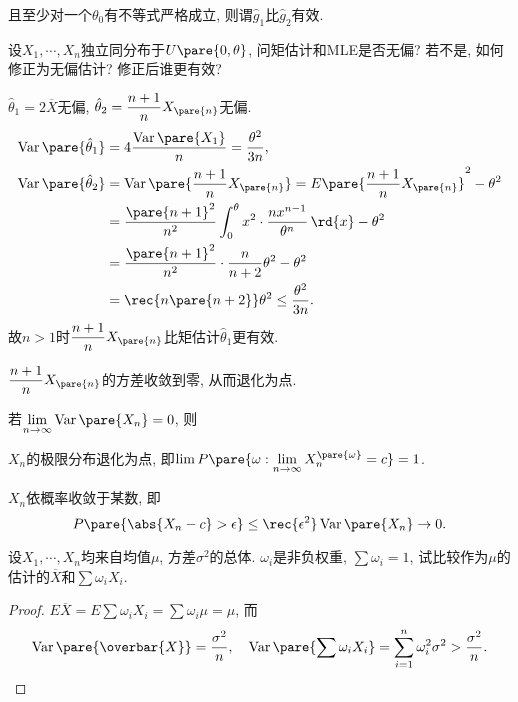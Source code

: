 \documentclass{ctexart}
\DeclareMathOperator{\Var}{Var}
\begin{document}
且至少对一个$\theta_0$有不等式严格成立, 则谓$\hat{g}_1$比$\hat{g}_2$有效.
\begin{sample}
    \begin{ex}
        设$X_1,\cdots,X_n$独立同分布于$U\pare{0,\theta}$, 问矩估计和MLE是否无偏? 若不是, 如何修正为无偏估计? 修正后谁更有效?
    \end{ex}
    \begin{solution}
        $\hat{\theta}_1 = 2\overbar{X}$无偏, $\hat{\theta}_2 = \displaystyle \frac{n+1}{n}X_{\pare{n}}$无偏.
        \begin{align*}
            \Var\pare{\hat{\theta}_1} &= 4 \frac{\Var\pare{X_1}}{n} = \frac{\theta^2}{3n}, \\
            \Var\pare{\hat{\theta}_2} &= \Var\pare{\frac{n+1}{n}X_{\pare{n}}} = E\pare{\frac{n+1}{n}X_{\pare{n}}}^2 - \theta^2 \\
            &= \frac{\pare{n+1}^2}{n^2}\int_0^\theta x^2\cdot \frac{nx^{n-1}}{\theta^n}\,\rd{x} - \theta^2 \\
            &= \frac{\pare{n+1}^2}{n^2} \cdot \frac{n}{n+2}\theta^2 - \theta^2 \\
            &= \rec{n\pare{n+2}}\theta^2 \le \frac{\theta^2}{3n}.
        \end{align*}
        故$n>1$时$\displaystyle \frac{n+1}{n}X_{\pare{n}}$比矩估计$\hat{\theta}_1$更有效.
    \end{solution}
    \begin{remark}
        $\displaystyle \frac{n+1}{n}X_{\pare{n}}$的方差收敛到零, 从而退化为点.
    \end{remark}
\end{sample}
\begin{proposition}
    若$\displaystyle \lim_{n\rightarrow\infty} \Var\pare{X_n} = 0$, 则
    \begin{cenum}
        \item $X_n$的极限分布退化为点, 即$\displaystyle \lim P\pare{\omega: \lim_{n\rightarrow\infty} X_n^{\pare{\omega}}=c}=1$.
        \item $X_n$依概率收敛于某数, 即
        \[ P\pare{\abs{X_n - c}>\epsilon} \le \rec{\epsilon^2}\Var\pare{X_n}\rightarrow 0. \]
    \end{cenum}
\end{proposition}
\begin{sample}
    \begin{ex}
        设$X_1,\cdots,X_n$均来自均值$\mu$, 方差$\sigma^2$的总体. $\omega_i$是非负权重, $\sum \omega_i = 1$, 试比较作为$\mu$的估计的$\overbar{X}$和$\sum \omega_iX_i$.
    \end{ex}
    \begin{proof}
        $E\overbar{X} = E\sum \omega_i X_i = \sum \omega_i \mu = \mu$, 而
        \[ \Var\pare{\overbar{X}} = \frac{\sigma^2}{n},\quad \Var\pare{\sum \omega_i X_i} = \sum_{i=1}^n \omega_i^2 \sigma^2 > \frac{\sigma^2}{n}. \qedhere \]
    \end{proof}
\end{sample}
\end{document}
